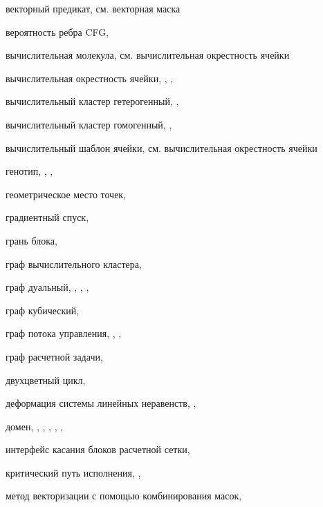 векторный предикат, см. векторная маска

вероятность ребра CFG, \pageref{term:edge_prob}

вычислительная молекула, см. вычислительная окрестность ячейки

вычислительная окрестность ячейки, \pageref{term:cell_calc_template}, \pageref{term:cell_calc_template2}, \pageref{term:cell_calc_template3}

вычислительный кластер гетерогенный, \pageref{term:cluster_getero}, \pageref{term:cluster_getero2}

вычислительный кластер гомогенный, \pageref{term:cluster_gomo}, \pageref{term:cluster_gomo2}

вычислительный шаблон ячейки, см. вычислительная окрестность ячейки

генотип, \pageref{term:genotype}, \pageref{term:genotype2}, \pageref{term:genotype3}

геометрическое место точек, \pageref{term:gmt}

градиентный спуск, \pageref{term:gradient_spusk}

грань блока, \pageref{term:block_facet}

граф вычислительного кластера, \pageref{term:graph_cluster}

граф дуальный, \pageref{term:dual_graph}, \pageref{term:dual_graph2}, \pageref{term:dual_graph3}, \pageref{term:dual_graph4}

граф кубический, \pageref{term:graph_cubic}

граф потока управления, \pageref{term:graph_cfg}, \pageref{term:graph_cfg2}, \pageref{term:graph_cfg3}

граф расчетной задачи, \pageref{term:graph_task}

двухцветный цикл, \pageref{term:bicolor_cycle}

деформация системы линейных неравенств, \pageref{term:deform_sys_lin_neravenstv}, \pageref{term:deform_sys_lin_neravenstv2}

домен, \pageref{term:domain}, \pageref{term:domain2}, \pageref{term:domain3}, \pageref{term:domain4}, \pageref{term:domain5}, \pageref{term:domain6}

интерфейс касания блоков расчетной сетки, \pageref{term:block_interface}

критический путь исполнения, \pageref{term:critical_path}, \pageref{term:critical_path2}

метод векторизации с помощью комбинирования масок, \pageref{term:meth_vec_comb}

